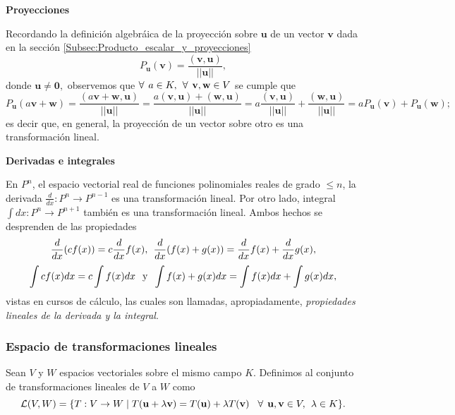 \documentclass[12pt]{article}
\begin{document}
\vspace{3mm}
\textbf{Proyecciones}

\vspace{2mm}
Recordando la definición algebráica de la proyección sobre $\mathbf{u}$ de un vector $\mathbf{v}$ dada en la sección \ref{Subsec:Producto_escalar_y_proyecciones} \[
    P_{\mathbf{u}}(\mathbf{v}) = \frac{(\mathbf{v},\mathbf{u})}{||\mathbf{u}||}
,\] \noindent donde $\mathbf{u}\neq\mathbf{0},$ observemos que $\forall \hspace{1.5mm} a\in K, \hspace{1.5mm} \forall\hspace{1.5mm}\mathbf{v},\mathbf{w}\in V$ se cumple que \[
P_{\mathbf{u}}(a\mathbf{v}+\mathbf{w})=\frac{(a\mathbf{v}+\mathbf{w},\mathbf{u})}{||\mathbf{u}||} = \frac{a(\mathbf{v},\mathbf{u})+(\mathbf{w},\mathbf{u})}{||\mathbf{u}||} = a\frac{(\mathbf{v},\mathbf{u})}{||\mathbf{u}||}+\frac{(\mathbf{w},\mathbf{u})}{||\mathbf{u}||}=a P_{\mathbf{u}}(\mathbf{v})+P_{\mathbf{u}}(\mathbf{w})  
;\] \noindent es decir que, en general, la proyección de un vector sobre otro es una transformación lineal.

\vspace{3mm}

\textbf{Derivadas e integrales} 

\vspace{2mm}
En $P^n$, el espacio vectorial real de funciones polinomiales reales de grado $\leq n$, la derivada $\frac{d}{dx}:P^n\to P^{n-1}$ es una transformación lineal. Por otro lado, integral $\int dx:P^n\to P^{n+1}$ también es una transformación lineal. Ambos hechos se desprenden de las propiedades $$\frac{d}{dx}(cf(x))=c\frac{d}{dx}f(x), \hspace{1.5mm} \frac{d}{dx}(f(x)+g(x))=\frac{d}{dx}f(x)+\frac{d}{dx}g(x),$$ $$\int cf(x) dx=c\int f(x) dx\hspace{2.5mm}\text{y}\hspace{2mm} \int f(x)+g(x) dx = \int f(x) dx + \int g(x) dx,$$ vistas en cursos de cálculo, las cuales son llamadas, apropiadamente, \emph{propiedades lineales de la derivada y la integral}. 
\vspace{3mm}


\subsubsection{Espacio de transformaciones lineales}

Sean $V$ y $W$ espacios vectoriales sobre el mismo campo $K$. Definimos al conjunto de transformaciones lineales de $V$ a $W$ como \[
    \mathcal{L}(V,W)=\{T:V\to W\mid T(\mathbf{u}+\lambda\mathbf{v})=T(\mathbf{u})+\lambda T(\mathbf{v})\hspace{3mm} \forall \hspace{1.5mm} \mathbf{u},\mathbf{v}\in V, \hspace{1.5mm} \lambda\in K\} 
.\] 
\end{document}

